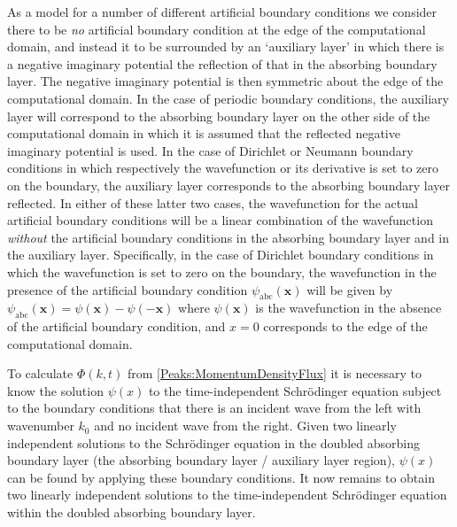 As a model for a number of different artificial boundary conditions we consider there to be \emph{no} artificial boundary condition at the edge of the computational domain, and instead it to be surrounded by an `auxiliary layer' in which there is a negative imaginary potential the reflection of that in the absorbing boundary layer. The negative imaginary potential is then symmetric about the edge of the computational domain. In the case of periodic boundary conditions, the auxiliary layer will correspond to the absorbing boundary layer on the other side of the computational domain in which it is assumed that the reflected negative imaginary potential is used. In the case of Dirichlet or Neumann boundary conditions in which respectively the wavefunction or its derivative is set to zero on the boundary, the auxiliary layer corresponds to the absorbing boundary layer reflected. In either of these latter two cases, the wavefunction for the actual artificial boundary conditions will be a linear combination of the wavefunction \emph{without} the artificial boundary conditions in the absorbing boundary layer and in the auxiliary layer. Specifically, in the case of Dirichlet boundary conditions in which the wavefunction is set to zero on the boundary, the wavefunction in the presence of the artificial boundary condition $\psi_\text{abc}(\bm{x})$ will be given by $\psi_\text{abc}(\bm{x}) = \psi(\bm{x}) - \psi(-\bm{x})$ where $\psi(\bm{x})$ is the wavefunction in the absence of the artificial boundary condition, and $x=0$ corresponds to the edge of the computational domain.

To calculate $\Phi(k, t)$ from \eqref{Peaks:MomentumDensityFlux} it is necessary to know the solution $\psi(x)$ to the time-independent Schrödinger equation subject to the boundary conditions that there is an incident wave from the left with wavenumber $k_0$ and no incident wave from the right. Given two linearly independent solutions to the Schrödinger equation in the doubled absorbing boundary layer (the absorbing boundary layer / auxiliary layer region), $\psi(x)$ can be found by applying these boundary conditions. It now remains to obtain two linearly independent solutions to the time-independent Schrödinger equation within the doubled absorbing boundary layer.

